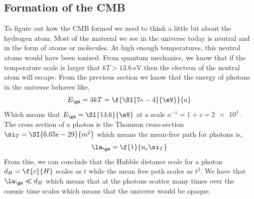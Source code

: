 \documentclass{article}
\begin{document}
\subsection{Formation of the CMB}

To figure out how the CMB formed we need to think a little bit about the hydrogen atom. Most of the material we see in the universe today is neutral and in the form of atoms or molecules. At high enough temperatures, this neutral atoms would have been ionized. From quantum mechanics, we know that if the temperature scale is larger that $k T > \SI{13.6}{\eV}$ then the electron of the neutral atom will escape. From the previous section we know that the energy of photons in the universe behaves like,
\[ E_\ga = 3 k T = \f{\SI{7e-4}{\eV}}{a} \]
Which means that $E_\ga = \SI{13.6}{\eV}$ at a scale $a^{-1} = 1+ z = \SI{2e4}{}$. The cross section of a photon is the Thomson cross-section $\si_T = \SI{6.65e-29}{m^2}$ which means the mean-free path for photons is,
\[ \la_\ga = \f{1}{n_e \si_T} \]
From this, we can conclude that the Hubble distance scale for a photon $d_H = \f{c}{H}$ scales as $t$ while the mean free path scales as $t^2$. We have that $\la_\ga \ll d_H$ which means that at the photons scatter many times over the cosmic time scales which means that the universe would be opaque. \\
\end{document}
